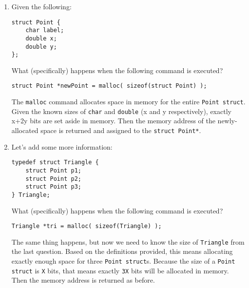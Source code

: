 \begin{enumerate}
\item Given the following:
\begin{lstlisting}[numbers=none]
struct Point {
	char label;
	double x;
	double y;
};
\end{lstlisting}

What (specifically) happens when the following command is executed?

\hspace{15mm} \texttt{struct Point *newPoint = malloc( sizeof(struct Point) );}

\begin{answer}
The \texttt{malloc} command allocates space in memory for the entire \texttt{Point struct}.
Given the known sizes of \texttt{char} and \texttt{double} (x and y respectively), exactly x+2y bits are set aside in memory.
Then the memory address of the newly-allocated space is returned and assigned to the \texttt{struct Point*}.
\end{answer}

\item Let's add some more information:
\begin{lstlisting}[numbers=none]
typedef struct Triangle {
	struct Point p1;
	struct Point p2;
	struct Point p3;
} Triangle;
\end{lstlisting}

What (specifically) happens when the following command is executed?

\hspace{15mm} \texttt{Triangle *tri = malloc( sizeof(Triangle) );}

\begin{answer}
The same thing happens, but now we need to know the size of \texttt{Triangle} from the last question.
Based on the definitions provided, this means allocating exactly enough space for three \texttt{Point struct}s.
Because the size of a \texttt{Point struct} is \texttt{X} bits, that means exactly \texttt{3X} bits will be allocated in memory.
Then the memory address is returned as before.
\end{answer}
\end{enumerate}